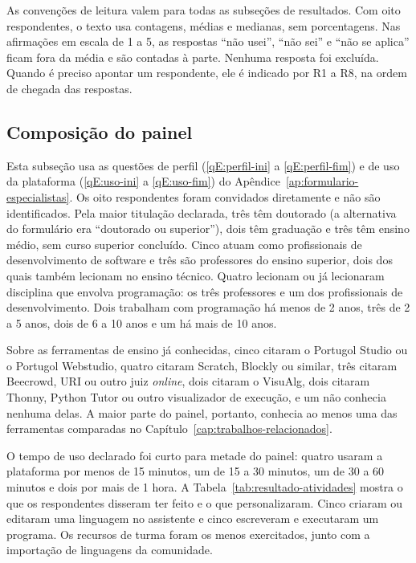 As convenções de leitura valem para todas as subseções de resultados. Com oito respondentes, o texto usa contagens, médias e medianas, sem porcentagens. Nas afirmações em escala de 1 a 5, as respostas ``não usei'', ``não sei'' e ``não se aplica'' ficam fora da média e são contadas à parte. Nenhuma resposta foi excluída. Quando é preciso apontar um respondente, ele é indicado por R1 a R8, na ordem de chegada das respostas.

\subsection{Composição do painel}
\label{sec:resultado-painel}

Esta subseção usa as questões de perfil (\ref{qE:perfil-ini} a \ref{qE:perfil-fim}) e de uso da plataforma (\ref{qE:uso-ini} a \ref{qE:uso-fim}) do Apêndice~\ref{ap:formulario-especialistas}. Os oito respondentes foram convidados diretamente e não são identificados. Pela maior titulação declarada, três têm doutorado (a alternativa do formulário era ``doutorado ou superior''), dois têm graduação e três têm ensino médio, sem curso superior concluído. Cinco atuam como profissionais de desenvolvimento de software e três são professores do ensino superior, dois dos quais também lecionam no ensino técnico. Quatro lecionam ou já lecionaram disciplina que envolva programação: os três professores e um dos profissionais de desenvolvimento. Dois trabalham com programação há menos de 2 anos, três de 2 a 5 anos, dois de 6 a 10 anos e um há mais de 10 anos.

Sobre as ferramentas de ensino já conhecidas, cinco citaram o Portugol Studio ou o Portugol Webstudio, quatro citaram Scratch, Blockly ou similar, três citaram Beecrowd, URI ou outro juiz \textit{online}, dois citaram o VisuAlg, dois citaram Thonny, Python Tutor ou outro visualizador de execução, e um não conhecia nenhuma delas. A maior parte do painel, portanto, conhecia ao menos uma das ferramentas comparadas no Capítulo~\ref{cap:trabalhos-relacionados}.

O tempo de uso declarado foi curto para metade do painel: quatro usaram a plataforma por menos de 15 minutos, um de 15 a 30 minutos, um de 30 a 60 minutos e dois por mais de 1 hora. A Tabela~\ref{tab:resultado-atividades} mostra o que os respondentes disseram ter feito e o que personalizaram. Cinco criaram ou editaram uma linguagem no assistente e cinco escreveram e executaram um programa. Os recursos de turma foram os menos exercitados, junto com a importação de linguagens da comunidade.

